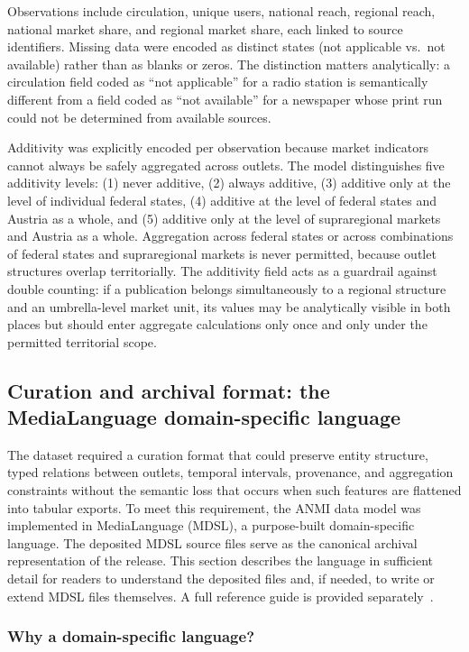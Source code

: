\documentclass[11pt]{article}
\begin{document}
Observations include circulation, unique users, national reach, regional reach, national market share, and regional market share, each linked to source identifiers. Missing data were encoded as distinct states (not applicable vs.\ not available) rather than as blanks or zeros. The distinction matters analytically: a circulation field coded as ``not applicable'' for a radio station is semantically different from a field coded as ``not available'' for a newspaper whose print run could not be determined from available sources.

Additivity was explicitly encoded per observation because market indicators cannot always be safely aggregated across outlets. The model distinguishes five additivity levels: (1) never additive, (2) always additive, (3) additive only at the level of individual federal states, (4) additive at the level of federal states and Austria as a whole, and (5) additive only at the level of supraregional markets and Austria as a whole. Aggregation across federal states or across combinations of federal states and supraregional markets is never permitted, because outlet structures overlap territorially. The additivity field acts as a guardrail against double counting: if a publication belongs simultaneously to a regional structure and an umbrella-level market unit, its values may be analytically visible in both places but should enter aggregate calculations only once and only under the permitted territorial scope.

\subsection{Curation and archival format: the MediaLanguage domain-specific language}

The dataset required a curation format that could preserve entity structure, typed relations between outlets, temporal intervals, provenance, and aggregation constraints without the semantic loss that occurs when such features are flattened into tabular exports. To meet this requirement, the ANMI data model was implemented in MediaLanguage (MDSL), a purpose-built domain-specific language. The deposited MDSL source files serve as the canonical archival representation of the release. This section describes the language in sufficient detail for readers to understand the deposited files and, if needed, to write or extend MDSL files themselves. A full reference guide is provided separately~\cite{MDSLReference2025}.

\subsubsection*{Why a domain-specific language?}
\end{document}
